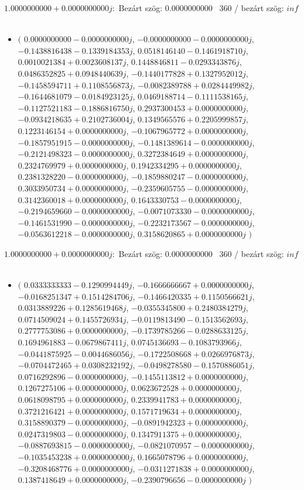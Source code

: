 \documentclass[14pt,a4paper]{article}
\begin{document}
$1.0000000000+0.0000000000j$:\
Bezárt szög: $0.0000000000$ \
360 / bezárt szög: $inf$\
\begin{itemize}
\item
$\big($
$0.0000000000-0.0000000000j$, $-0.0000000000-0.0000000000j$, $-0.1438816438-0.1339184353j$, $0.0518146140-0.1461918710j$, $0.0010021384+0.0023608137j$, $0.1448846811-0.0293343876j$, $0.0486352825+0.0948440639j$, $-0.1440177828+0.1327952012j$, $-0.1458594711+0.1108556873j$, $-0.0082389788+0.0284449982j$, $-0.1644681079-0.0184923125j$, $0.0469188714-0.1111538165j$, $-0.1127521183-0.1886816750j$, $0.2937300453+0.0000000000j$, $-0.0934218635+0.2102736004j$, $0.1349565576+0.2205999857j$, $0.1223146154+0.0000000000j$, $-0.1067965772+0.0000000000j$, $-0.1857951915-0.0000000000j$, $-0.1481389614-0.0000000000j$, $-0.2121498323-0.0000000000j$, $0.3272384649+0.0000000000j$, $0.2324769979+0.0000000000j$, $0.1942334295+0.0000000000j$, $0.2381328220-0.0000000000j$, $-0.1859880247-0.0000000000j$, $0.3033950734+0.0000000000j$, $-0.2359605755-0.0000000000j$, $0.3142360018+0.0000000000j$, $0.1643330753-0.0000000000j$, $-0.2194659660-0.0000000000j$, $-0.0071073330-0.0000000000j$, $-0.1461531990-0.0000000000j$, $-0.2232173567-0.0000000000j$, $-0.0563612218-0.0000000000j$, $0.3158620865+0.0000000000j$
$\big)$
\end{itemize}
$1.0000000000+0.0000000000j$:\
Bezárt szög: $0.0000000000$ \
360 / bezárt szög: $inf$\
\begin{itemize}
\item
$\big($
$0.0333333333-0.1290994449j$, $-0.1666666667+0.0000000000j$, $-0.0168251347+0.1514284706j$, $-0.1466420335+0.1150566621j$, $0.0313889226+0.1285619468j$, $-0.0355345800+0.2480384279j$, $0.0714509024+0.1455726934j$, $-0.0119813490-0.1513562693j$, $0.2777753086+0.0000000000j$, $-0.1739785266-0.0288633125j$, $0.1694961883-0.0679867411j$, $0.0745136693-0.1083793966j$, $-0.0441875925-0.0044686056j$, $-0.1722508668+0.0266976873j$, $-0.0704472465+0.0308232192j$, $-0.0498278580-0.1570886051j$, $0.0716292896-0.0000000000j$, $-0.1455113812+0.0000000000j$, $0.1267275106+0.0000000000j$, $0.0623672528+0.0000000000j$, $0.0618098795+0.0000000000j$, $0.2339941783+0.0000000000j$, $0.3721216421+0.0000000000j$, $0.1571719634+0.0000000000j$, $0.3158890379-0.0000000000j$, $-0.0891942323+0.0000000000j$, $0.0247319803-0.0000000000j$, $0.1347911375+0.0000000000j$, $-0.0887693815-0.0000000000j$, $-0.0821070957-0.0000000000j$, $-0.1035453238+0.0000000000j$, $0.1665078796+0.0000000000j$, $-0.3208468776+0.0000000000j$, $-0.0311271838+0.0000000000j$, $0.1387418649+0.0000000000j$, $-0.2390796656-0.0000000000j$
$\big)$
\end{itemize}
\end{document}

